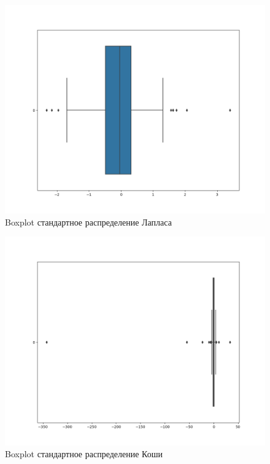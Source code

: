 \documentclass[a4]{article}
\begin{document}
\begin{center}
	\begin{figure}[H]
		\caption{Boxplot стандартное распределение Лапласа }
		\includegraphics[width=\textwidth]{Lab3_boxplot_N=100_laplace.png} 
	\end{figure}
	
	\begin{figure}[H]
		\caption{Boxplot стандартное распределение Коши }
		\includegraphics[width=\textwidth]{Lab3_boxplot_N=100_cauchy.png} 
	\end{figure}
	

\end{center}
\end{document}
